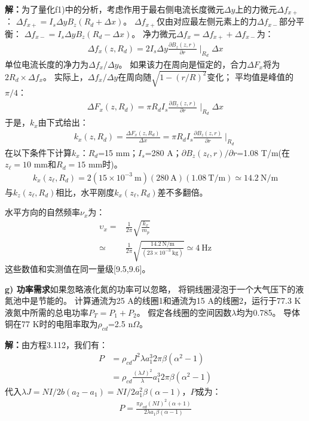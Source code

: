\textbf{解：}为了量化f1)中的分析，考虑作用于最右侧电流长度微元$\Delta y$上的力微元$\Delta f_{x+}$：
$\Delta f_{x+}=I_s\Delta y B_z(R_d+\Delta x)$。
$\Delta f_{x+}$仅由对应最左侧元素上的力$\Delta f_{x-}$部分平衡：
$\Delta f_{x-}=I_s\Delta y B_z(R_d-\Delta x)$。
净力微元$\Delta f_{x}=\Delta f_{x+}+\Delta f_{x-}$为：
\begin{align*}%
\Delta f_x(z,R_d)=2I_s\Delta y\frac{\partial B_z(z,r)}{\partial r}\mid_{R_d}\Delta x \tag{f2.2}
\end{align*}
单位电流长度的净力为$\Delta f_{x}/\Delta y$。
如果该力在周向是恒定的，合力$\Delta F_x$将为$2R_d\times \Delta f_x$。
实际上，$\Delta f_{x}/\Delta y$在周向随$\sqrt{1-(r/R)^2}$变化；
平均值是峰值的$\pi/4$：
\begin{align*}%
\Delta F_x(z,R_d)=\pi R_dI_s\frac{\partial B_z(z,r)}{\partial r}\mid_{R_d}\Delta x \tag{f2.2}
\end{align*}
于是，$k_x$由下式给出：
\begin{align*}%
k_x(z,R_d)=\frac{\Delta F_x(z,R_d)}{\Delta x}=\pi R_dI_s\frac{\partial B_z(z,r)}{\partial r}\mid_{R_d}
\end{align*}
在以下条件下计算$k_x$：$R_d$=15 mm；$I_s$=280 A；$\partial B_z(z_\ell,r)/\partial r$=1.08 T/m(在$z_\ell=10$ mm和$R_d=15$ mm时)。
\begin{align*}%
k_x(z_\ell,R_d)=2(15\times 10^{-3}\ \mathrm{m})(280\ \mathrm{A})(1.08\ \mathrm{T/m})\simeq 14.2\ \mathrm{N/m}
\end{align*}
与$k_z(z_\ell,R_d)$相比，水平刚度$k_x(z_\ell,R_d)$差不多翻倍。

水平方向的自然频率$\nu_x$为：
\begin{align*}%
\upsilon_x=&\frac{1}{2\pi}\sqrt{\frac{k_x}{m_p}}  \\\tag{f2.4}
\simeq&\frac{1}{2\pi}\sqrt{\frac{14.2\ \mathrm{N/m}}{(23\times 10^{-3}\ \mathrm{kg})}}\simeq 4\ \mathrm{Hz}
\end{align*}
这些数值和实测值在同一量级[9.5,9.6]。

\textbf{g) 功率需求}\qquad 如果忽略液化氮的功率可以忽略，
将铜线圈浸泡于一个大气压下的液氮池中是节能的。
计算通流为25 A的线圈1和通流为15 A的线圈2，运行于77.3 K液氮中所需的总电功率$P_T=P_1+P_2$。
假定各线圈的空间因数$\lambda$均为0.785。
导体铜在77 K时的电阻率取为$\rho_{cd}$=2.5 n$\Omega$。

\textbf{解：}由方程3.112，我们有：
\begin{align*}%
P&=\rho_{cd}J^2\lambda a_{1}^{3}2\pi\beta(\alpha^2-1) \\\tag{3.112}
&=\rho_{cd}\frac{(\lambda J)^2}{\lambda}a_{1}^{3}2\pi\beta(\alpha^2-1)
\end{align*}
代入$\lambda J=NI/2b(a_2-a_1)=NI/2a_1^2\beta(\alpha-1)$，$P$成为：
\begin{align*}%
P=\frac{\pi\rho_{cd}(NI)^2(\alpha+1)}{2\lambda a_1\beta(\alpha-1)} \tag{g.1}
\end{align*}

